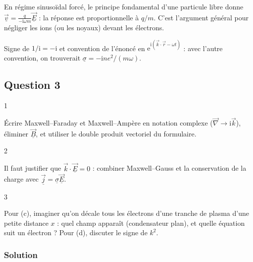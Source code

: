 \documentclass[11pt,a4paper]{article}
\begin{document}
\begin{methode}

En régime sinusoïdal forcé, le principe fondamental d'une particule libre donne \(\underline{\vec v}=\frac{q}{-\mathrm i\omega m}\underline{\vec E}\) : la réponse est proportionnelle à \(q/m\). C'est l'argument général pour négliger les ions (ou les noyaux) devant les électrons.

\end{methode}

\begin{piege}

Signe de \(1/\mathrm i=-\mathrm i\) et convention de l'énoncé en \(\mathrm e^{\mathrm i(\vec k\cdot\vec r-\omega t)}\) : avec l'autre convention, on trouverait \(\underline\sigma=-\mathrm i n e^2/(m\omega)\).

\end{piege}

\hypertarget{question-3}{%
\subsection{Question 3}\label{question-3}}

\begin{indication}{1}

Écrire Maxwell--Faraday et Maxwell--Ampère en notation complexe (\(\vec\nabla\to\mathrm i\vec k\)), éliminer \(\underline{\vec B}\), et utiliser le double produit vectoriel du formulaire.

\end{indication}

\begin{indication}{2}

Il faut justifier que \(\vec k\cdot\underline{\vec E}=0\) : combiner Maxwell--Gauss et la conservation de la charge avec \(\underline{\vec j}=\underline\sigma\underline{\vec E}\).

\end{indication}

\begin{indication}{3}

Pour (c), imaginer qu'on décale tous les électrons d'une tranche de plasma d'une petite distance \(x\) : quel champ apparaît (condensateur plan), et quelle équation suit un électron ? Pour (d), discuter le signe de \(k^2\).

\end{indication}

\hypertarget{solution-2}{%
\subsubsection{Solution}\label{solution-2}}
\end{document}
